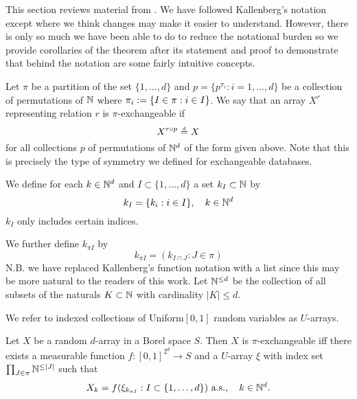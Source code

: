 This section reviews material from \citet{Kallenberg1999-pj}.
We have followed Kallenberg's notation except where we think changes may make it easier to understand.
However, there is only so much we have been able to do to reduce the notational burden so we provide corollaries of the theorem after its statement and proof to demonstrate that behind the notation are some fairly intuitive concepts.

Let $\pi$ be a partition of the set $\{1,\dots,d\}$ and $p = \{p^{\pi_i} : i = 1,\dots,d\}$ be a collection of permutations of $\mathbb{N}$ where $\pi_i := \{I \in \pi : i \in I\}$.
We say that an array $X^r$ representing relation $r$ is $\pi$-exchangeable if 
\begin{equation}
  X^{r\circ p} \overset{\,_{\!d}}{=} X
\end{equation}
for all collections $p$ of permutations of $\mathbb{N}^d$ of the form given above.
Note that this is precisely the type of symmetry we defined for exchangeable databases.

We define for each $k \in \mathbb{N}^d$ and $I \subset \{1,\ldots,d\}$ a set $k_I \subset \mathbb{N}$ by
\begin{equation}
k_I = \{k_i: i \in I\}, \quad k \in \mathbb{N}^d
\end{equation}
\ie $k_I$ only includes certain indices.

We further define $k_{\pi I}$ by
\begin{equation}
  k_{\pi I} = (k_{I \cap J} : J \in \pi)
\end{equation}
N.B. we have replaced Kallenberg's function notation with a list since this may be more natural to the readers of this work.
Let $\mathbb{N}^{\leq d}$ be the collection of all subsets of the naturals $K \subset \mathbb{N}$ with cardinality $|K| \leq d$.

We refer to indexed collections of \iid Uniform$[0,1]$ random variables as $U$-arrays.

\begin{prop}
\label{prop:piexas}
  Let $X$ be a random $d$-array in a Borel space $S$.
  Then $X$ is $\pi$-exchangeable iff there exists a measurable function $f:[0,1]^{2^d}\to S$ and a $U$-array $\xi$ with index set $\prod_{J\in\pi} \mathbb{N}^{\leq |J|}$ such that
  \begin{equation}
    X_k = f(\xi_{k_{\pi I}} : I \subset \{1,\ldots,d\}) \ \textrm{a.s.}, \quad k \in \mathbb{N}^d.
    \label{eq:piexas}
  \end{equation}
\end{prop}

